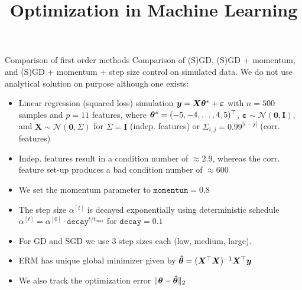 \documentclass[11pt,compress,t,notes=noshow, xcolor=table]{beamer}
\title{Optimization in Machine Learning}
\begin{document}


\begin{vbframe}{Comparison of first order methods}
Comparison of (S)GD, (S)GD + momentum, and (S)GD + momentum + step size control on simulated data. We do not use analytical solution on purpose although one exists:

\begin{itemize}
    \item Linear regression (squared loss) simulation $\bm{y} = \bm{X}\bm{\theta}^{\ast} + \bm{\varepsilon}$ with $n=500$ samples and $p=11$ features, where $\bm{\theta}^{\ast}=(-5,-4,\ldots,4,5)^{\top}$, $\bm{\varepsilon} \sim \mathcal{N}(\bm{0}, \bm{I})$, and $\bm{X} \sim \mathcal{N}(\bm{0}, \Sigma)$ for $\Sigma=\bm{I}$ (indep. features) or $\Sigma_{i,j}=0.99^{|i-j|}$ (corr. features)
    \item Indep. features result in a condition number of $\approx 2.9$, whereas the corr. feature set-up produces a bad condition number of $\approx 600$
    \item We set the momentum parameter to $\texttt{momentum}=0.8$
    \item The step size $\alpha^{[t]}$ is decayed exponentially using deterministic schedule $\alpha^{[t]}=\alpha^{[0]} \cdot \texttt{decay}^{t/t_{\text{max}}}$ for $\texttt{decay}=0.1$
    \item For GD and SGD we use 3 step sizes each (low, medium, large). %
    \item ERM has unique global minimizer given by $\bm{\hat{\theta}} = (\bm{X}^{\top}\bm{X})^{-1}\bm{X}^{\top} \bm{y}$
    \item We also track the optimization error $\Vert \bm{\theta} - \bm{\hat{\theta}} \Vert_2$
\end{itemize}

\end{vbframe}

\end{document}
